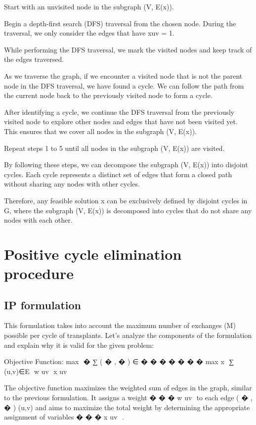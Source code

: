\documentclass{ULBreport}
\begin{document}
Start with an unvisited node in the subgraph (V, E(x)).

Begin a depth-first search (DFS) traversal from the chosen node. During the traversal, we only consider the edges that have xuv = 1.

While performing the DFS traversal, we mark the visited nodes and keep track of the edges traversed.

As we traverse the graph, if we encounter a visited node that is not the parent node in the DFS traversal, we have found a cycle. We can follow the path from the current node back to the previously visited node to form a cycle.

After identifying a cycle, we continue the DFS traversal from the previously visited node to explore other nodes and edges that have not been visited yet. This ensures that we cover all nodes in the subgraph (V, E(x)).

Repeat steps 1 to 5 until all nodes in the subgraph (V, E(x)) are visited.

By following these steps, we can decompose the subgraph (V, E(x)) into disjoint cycles. Each cycle represents a distinct set of edges that form a closed path without sharing any nodes with other cycles.

Therefore, any feasible solution x can be exclusively defined by disjoint cycles in G, where the subgraph (V, E(x)) is decomposed into cycles that do not share any nodes with each other.

\chapter{Positive cycle elimination procedure}

\section{IP formulation}
 This formulation takes into account the maximum number of exchanges (M) possible per cycle of transplants. Let's analyze the components of the formulation and explain why it is valid for the given problem:

Objective Function:
max
⁡
�
∑
(
�
,
�
)
∈
�
�
�
�
�
�
�
max 
x
​
 ∑ 
(u,v)∈E
​
 w 
uv
​
 x 
uv
​
 
The objective function maximizes the weighted sum of edges in the graph, similar to the previous formulation. It assigns a weight 
�
�
�
w 
uv
​
  to each edge 
(
�
,
�
)
(u,v) and aims to maximize the total weight by determining the appropriate assignment of variables 
�
�
�
x 
uv
​
 .
\end{document}
